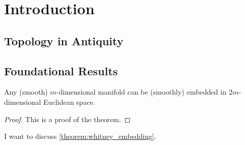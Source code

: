 \chapter{Introduction}%

\section{Topology in Antiquity}


\section{Foundational Results}

%
\begin{theorem}\label{theorem:whitney_embedding}
  Any (smooth) $m$-dimensional manifold can be (smoothly) embedded in $2m$-dimensional Euclidean space.
\end{theorem}

\begin{proof}
  This is a proof of the theorem.
\end{proof}

I want to discuss \cref{theorem:whitney_embedding}.
%
%
%
%
